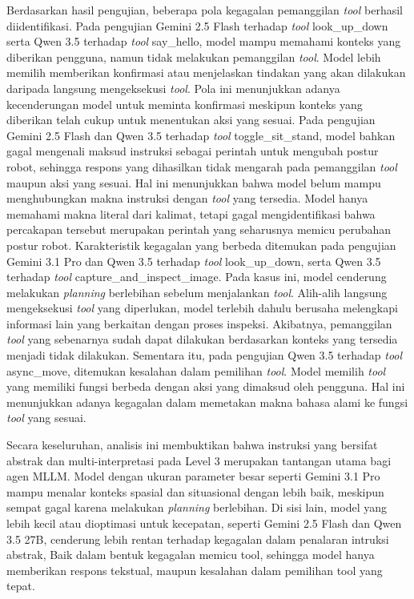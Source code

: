 Berdasarkan hasil pengujian, beberapa pola kegagalan pemanggilan \textit{tool} berhasil diidentifikasi. Pada pengujian Gemini 2.5 Flash terhadap \textit{tool} look\_up\_down serta Qwen 3.5 terhadap \textit{tool} say\_hello, model mampu memahami konteks yang diberikan pengguna, namun tidak melakukan pemanggilan \textit{tool}. Model lebih memilih memberikan konfirmasi atau menjelaskan tindakan yang akan dilakukan daripada langsung mengeksekusi \textit{tool}. Pola ini menunjukkan adanya kecenderungan model untuk meminta konfirmasi meskipun konteks yang diberikan telah cukup untuk menentukan aksi yang sesuai. Pada pengujian Gemini 2.5 Flash dan Qwen 3.5 terhadap \textit{tool} toggle\_sit\_stand, model bahkan gagal mengenali maksud instruksi sebagai perintah untuk mengubah postur robot, sehingga respons yang dihasilkan tidak mengarah pada pemanggilan \textit{tool} maupun aksi yang sesuai. Hal ini menunjukkan bahwa model belum mampu menghubungkan makna instruksi dengan \textit{tool} yang tersedia. Model hanya memahami makna literal dari kalimat, tetapi gagal mengidentifikasi bahwa percakapan tersebut merupakan perintah yang seharusnya memicu perubahan postur robot. Karakteristik kegagalan yang berbeda ditemukan pada pengujian Gemini 3.1 Pro dan Qwen 3.5 terhadap \textit{tool} look\_up\_down, serta Qwen 3.5 terhadap \textit{tool} capture\_and\_inspect\_image. Pada kasus ini, model cenderung melakukan \textit{planning} berlebihan sebelum menjalankan \textit{tool}. Alih-alih langsung mengeksekusi \textit{tool} yang diperlukan, model terlebih dahulu berusaha melengkapi informasi lain yang berkaitan dengan proses inspeksi. Akibatnya, pemanggilan \textit{tool} yang sebenarnya sudah dapat dilakukan berdasarkan konteks yang tersedia menjadi tidak dilakukan. Sementara itu, pada pengujian Qwen 3.5 terhadap \textit{tool} async\_move, ditemukan kesalahan dalam pemilihan \textit{tool}. Model memilih \textit{tool} yang memiliki fungsi berbeda dengan aksi yang dimaksud oleh pengguna. Hal ini menunjukkan adanya kegagalan dalam memetakan makna bahasa alami ke fungsi \textit{tool} yang sesuai.

Secara keseluruhan, analisis ini membuktikan bahwa instruksi yang bersifat abstrak dan multi-interpretasi pada Level 3 merupakan tantangan utama bagi agen MLLM. Model dengan ukuran parameter besar seperti Gemini 3.1 Pro mampu menalar konteks spasial dan situasional dengan lebih baik, meskipun sempat gagal karena melakukan \textit{planning} berlebihan. Di sisi lain, model yang lebih kecil atau dioptimasi untuk kecepatan, seperti Gemini 2.5 Flash dan Qwen 3.5 27B, cenderung lebih rentan terhadap kegagalan dalam penalaran intruksi abstrak, Baik dalam bentuk kegagalan memicu tool, sehingga model hanya memberikan respons tekstual, maupun kesalahan dalam pemilihan tool yang tepat.


